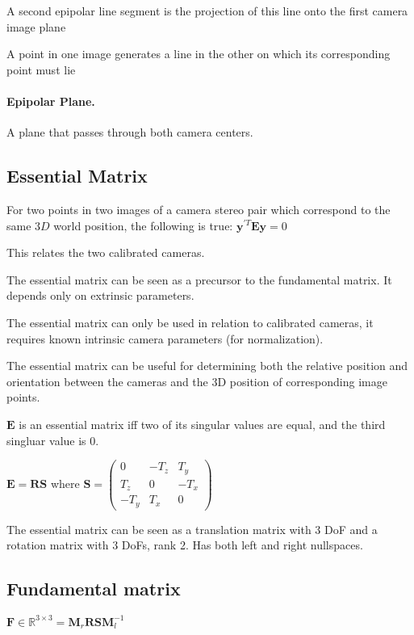 A second epipolar line segment is the projection of this line onto the first camera image plane

A point in one image generates a line in the other on which its corresponding point must lie

\paragraph{Epipolar Plane.} A plane that passes through both camera centers.

\subsection{Essential Matrix}

For two points in two images of a camera stereo pair which correspond to the same $3D$ world position, the following is true: $\mathbf{y}^{\prime T}\mathbf{Ey}=0$

This relates the two calibrated cameras.

The essential matrix can be seen as a precursor to the fundamental matrix. It depends only on extrinsic parameters.

The essential matrix can only be used in relation to calibrated cameras, it requires known intrinsic camera parameters (for normalization).

The essential matrix can be useful for determining both the relative position and orientation between the cameras and the 3D position of corresponding image points.

$\mathbf{E}$ is an essential matrix iff two of its singular values are equal, and the third singluar value is 0.

$\mathbf{E}=\mathbf{RS}$ where $\mathbf{S} = \left( \begin{matrix} 0 & -T_z & T_y \\ T_z & 0 & -T_x \\ -T_y & T_x & 0  \end{matrix} \right)$

The essential matrix can be seen as a translation matrix with 3 DoF and a rotation matrix with 3 DoFs, rank 2. Has both left and right nullspaces.

\subsection{Fundamental matrix}
$\mathbf F \in \mathbb{R}^{3\times3} = \mathbf{M}_r\mathbf{RSM}_l^{-1}$ 

